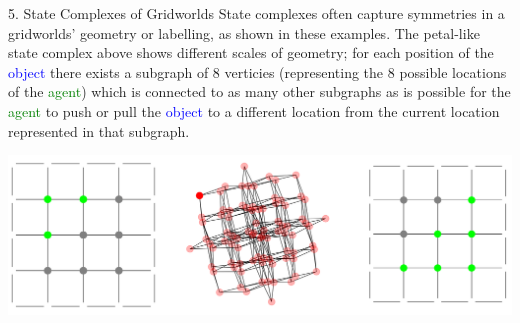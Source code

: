\documentclass[
    a0paper, %
    landscape, %
    fontscale=0.3 %
    ]{baposter}
\begin{document}
\begin{poster}
\begin{posterbox}[
    name = scsofgrids,  %
    column = 2, %
    span = 2,
    bottomaligned=grid,
    above=references
    ]{5. State Complexes of Gridworlds}
State complexes often capture symmetries in a gridworlds' geometry or labelling, as shown in these examples. The petal-like state complex above shows different scales of geometry; for each position of the \textcolor{blue}{object} there exists a subgraph of 8 verticies (representing the 8 possible locations of the \textcolor{green}{agent}) which is connected to as many other subgraphs as is possible for the \textcolor{green}{agent} to push or pull the \textcolor{blue}{object} to a different location from the current location represented in that subgraph.

\vspace{0.6cm}
\begin{center}
    \includegraphics[width=1\textwidth]{3-6-agents.PNG}
\end{center}
\end{posterbox}

\end{poster}
\end{document}

